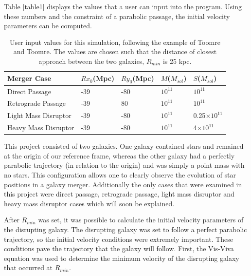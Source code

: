 \documentclass[11pt]{article}
\begin{document}
Table \ref{table1} displays the values that a user can input into the program. Using these numbers and the constraint of a parabolic passage, the initial velocity parameters can be computed.

\begin{table}[h!]
\centering
\caption{User input values for this simulation, following the example of Toomre and Toomre.  The values are chosen such that the distance of closest approach between the two galaxies, $R_{min}$ is 25 kpc.}
\begin{tabular}{l l l l l}
Merger Case & $Rx_0$(Mpc) & $Ry_0$(Mpc) & $M$($M_{sol}$) & $S$($M_{sol}$) \\
\hline	%
Direct Passage & -39 & -80 & $10^{11}$ & $10^{11}$ \\
Retrograde Passage & -39 & 80 & $10^{11}$ & $10^{11}$ \\
Light Mass Disruptor & -39 & -80 & $10^{11}$ & 0.25$\times10^{11}$ \\
Heavy Mass Disruptor & -39 & -80 & $10^{11}$ & 4$\times10^{11}$ \\
\end{tabular}
\label{table2}
\end{table}


This project consisted of two galaxies.  One galaxy contained stars and remained at the origin of our reference frame, whereas the other galaxy had a perfectly parabolic trajectory (in relation to the origin) and was simply a point mass with no stars.  This configuration allows one to clearly observe the evolution of star positions in a galaxy merger.  Additionally the only cases that were examined in this project were direct passage, retrograde passage, light mass disruptor and heavy mass disruptor cases which will soon be explained. 

After $R_{min}$ was set, it was possible to calculate the initial velocity parameters of the disrupting galaxy.  The disrupting galaxy was set to follow a perfect parabolic trajectory, so the initial velocity conditions were extremely important. These conditions pave the trajectory that the galaxy will follow.  First, the Vis-Viva equation was used to determine the minimum velocity of the disrupting galaxy that occurred at $R_{min}$.  
\end{document}
